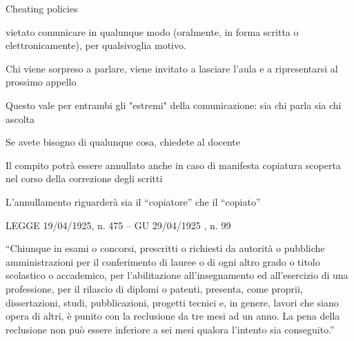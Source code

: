 \begin{frame}{Cheating policies}
	
\vspace{-9pt}
\begin{myboxtitle}
\BI
\item \EE vietato comunicare in qualunque modo (oralmente, in forma scritta o elettronicamente), per qualsivoglia motivo.
\item Chi viene sorpreso a parlare, viene invitato a lasciare l'aula e a ripresentarsi al prossimo appello
\item Questo vale per entrambi gli "estremi" della comunicazione: sia chi parla sia chi ascolta
\item Se avete bisogno di qualunque cosa, chiedete al docente	
\EI
\end{myboxtitle}

\begin{myboxtitle}
\BI
\item Il compito potrà essere annullato anche in caso di manifesta copiatura scoperta nel corso della correzione degli scritti
\item L'annullamento riguarderà sia il “copiatore” che il “copiato”
\EI
\end{myboxtitle}

\end{frame}
\begin{frame}{LEGGE 19/04/1925, n. 475 -- GU 29/04/1925 , n. 99}
	
\vspace{-9pt}
\begin{myboxtitle}[Art. 1]
“Chiunque in esami o concorsi, prescritti o richiesti da autorità o pubbliche
amministrazioni per il conferimento di lauree o di ogni altro grado o titolo
scolastico o accademico, per l'abilitazione all'insegnamento ed all'esercizio
di una professione, per il rilascio di diplomi o patenti, presenta, come
proprii, dissertazioni, studi, pubblicazioni, progetti tecnici e, in genere,
lavori che siano opera di altri, è punito con la reclusione da tre mesi ad un
anno. La pena della reclusione non può essere inferiore a sei mesi qualora
l'intento sia conseguito.”
\end{myboxtitle}
	
\end{frame}

